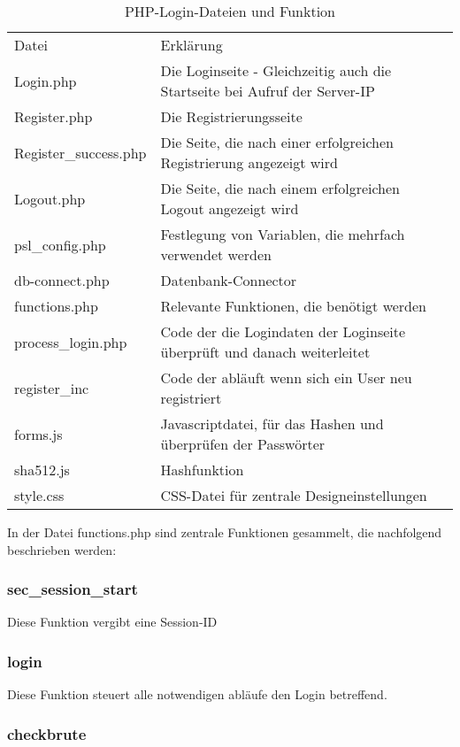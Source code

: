 \begin{table}
\caption{PHP-Login-Dateien und Funktion}
\label{tab:Login-Dateien}
\begin{tabular}{p{} p{}}
Datei & Erklärung \\
Login.php & Die Loginseite - Gleichzeitig auch die Startseite bei Aufruf der
Server-IP\\
Register.php & Die Registrierungsseite \\
Register\_success.php & Die Seite, die nach einer erfolgreichen Registrierung
angezeigt wird \\
Logout.php & Die Seite, die nach einem erfolgreichen Logout angezeigt wird \\
psl\_config.php & Festlegung von Variablen, die mehrfach verwendet werden \\
db-connect.php & Datenbank-Connector \\
functions.php & Relevante Funktionen, die benötigt werden \\
process\_login.php & Code der die Logindaten der Loginseite überprüft und danach
weiterleitet \\
register\_inc & Code der abläuft wenn sich ein User neu registriert \\
forms.js & Javascriptdatei, für das Hashen und überprüfen der Passwörter \\
sha512.js & Hashfunktion \\
style.css & CSS-Datei für zentrale Designeinstellungen \\
 \end{tabular}
\end{table}

In der Datei functions.php sind zentrale Funktionen gesammelt, die nachfolgend
beschrieben werden:

\subsubsection{sec\_session\_start}
Diese Funktion vergibt eine Session-ID

\subsubsection{login}
Diese Funktion steuert alle notwendigen abläufe den Login betreffend.

\subsubsection{checkbrute}

